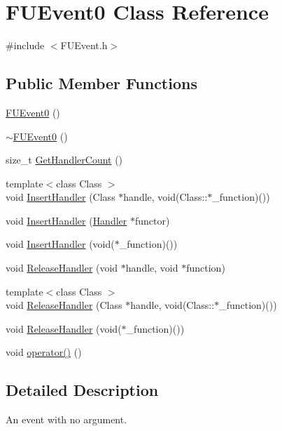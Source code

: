 \hypertarget{classFUEvent0}{
\section{FUEvent0 Class Reference}
\label{classFUEvent0}
}


{\ttfamily \#include $<$FUEvent.h$>$}

\subsection*{Public Member Functions}
\begin{DoxyCompactItemize}
\item 
\hyperlink{classFUEvent0_ac922d1c9843d5839e7fa53bb726fa970}{FUEvent0} ()
\item 
\hyperlink{classFUEvent0_ad727e4cef998908a0bc61b6519d19045}{$\sim$FUEvent0} ()
\item 
size\_\-t \hyperlink{classFUEvent0_a368d671f36ea0deec05b8f7103a1f922}{GetHandlerCount} ()
\item 
{\footnotesize template$<$class Class $>$ }\\void \hyperlink{classFUEvent0_a886f064cc7d90306e60ac22953d0eeff}{InsertHandler} (Class $\ast$handle, void(Class::$\ast$\_\-function)())
\item 
void \hyperlink{classFUEvent0_a6f9333d11913cd7f2e1a523f4f83dcd4}{InsertHandler} (\hyperlink{classIFunctor0}{Handler} $\ast$functor)
\item 
void \hyperlink{classFUEvent0_a16b5976121190399081738a636ba8c26}{InsertHandler} (void($\ast$\_\-function)())
\item 
void \hyperlink{classFUEvent0_a443329d8bcd603e0818a196608dca6d2}{ReleaseHandler} (void $\ast$handle, void $\ast$function)
\item 
{\footnotesize template$<$class Class $>$ }\\void \hyperlink{classFUEvent0_a07976577ab71e678872c8dd4b8df3e8f}{ReleaseHandler} (Class $\ast$handle, void(Class::$\ast$\_\-function)())
\item 
void \hyperlink{classFUEvent0_aec9f915e14a40ab50613341514e72d52}{ReleaseHandler} (void($\ast$\_\-function)())
\item 
void \hyperlink{classFUEvent0_acb4b5035be58291747200ca334139d95}{operator()} ()
\end{DoxyCompactItemize}


\subsection{Detailed Description}
An event with no argument. 

